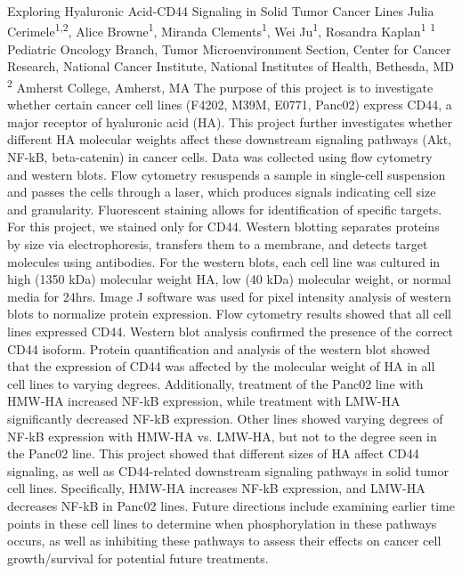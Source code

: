 \makeabstract
    {
    Exploring Hyaluronic Acid-CD44 Signaling in Solid Tumor Cancer Lines  
    }
    {
    Julia Cerimele\textsuperscript{1,2}, Alice Browne\textsuperscript{1}, Miranda Clements\textsuperscript{1}, Wei Ju\textsuperscript{1}, Rosandra Kaplan\textsuperscript{1}
    }
    {
    \textsuperscript{1} Pediatric Oncology Branch, Tumor Microenvironment Section, Center for Cancer Research, National Cancer Institute, National Institutes of Health, Bethesda, MD \\
\textsuperscript{2} Amherst College, Amherst, MA
    }
    {
    The purpose of this project is to investigate whether certain cancer cell lines (F4202, M39M, E0771, Panc02) express CD44, a major receptor of hyaluronic acid (HA). This project further investigates whether different HA molecular weights affect these downstream signaling pathways (Akt, NF-kB, beta-catenin) in cancer cells.
    }
    {
    Data was collected using flow cytometry and western blots. Flow cytometry resuspends a sample in single-cell suspension and passes the cells through a laser, which produces signals indicating cell size and granularity. Fluorescent staining allows for identification of specific targets. For this project, we stained only for CD44. Western blotting separates proteins by size via electrophoresis, transfers them to a membrane, and detects target molecules using antibodies. For the western blots, each cell line was cultured in high (1350 kDa) molecular weight HA, low (40 kDa) molecular weight, or normal media for 24hrs. Image J software was used for pixel intensity analysis of western blots to normalize protein expression.
    }
    {
    Flow cytometry results showed that all cell lines expressed CD44. Western blot analysis confirmed the presence of the correct CD44 isoform. Protein quantification and analysis of the western blot showed that the expression of CD44 was affected by the molecular weight of HA in all cell lines to varying degrees. Additionally, treatment of the Panc02 line with HMW-HA increased NF-kB expression, while treatment with LMW-HA significantly decreased NF-kB expression. Other lines showed varying degrees of NF-kB expression with HMW-HA vs. LMW-HA, but not to the degree seen in the Panc02 line.
    }
    {
    This project showed that different sizes of HA affect CD44 signaling, as well as CD44-related downstream signaling pathways in solid tumor cell lines. Specifically, HMW-HA increases NF-kB expression, and LMW-HA decreases NF-kB in Panc02 lines. Future directions include examining earlier time points in these cell lines to determine when phosphorylation in these pathways occurs, as well as inhibiting these pathways to assess their effects on cancer cell growth/survival for potential future treatments.
    }

    \newpage
    